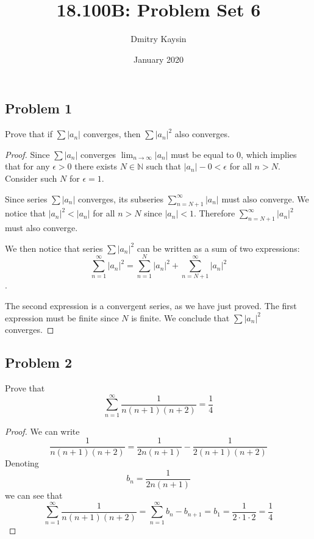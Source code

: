 \documentclass{article}
\title{18.100B: Problem Set 6}
\author{Dmitry Kaysin}
\date{January 2020}
\newcommand{\N}{\mathbb{N}}
\theoremstyle{remark}
\begin{document}
\maketitle 


\subsection*{Problem 1}

\begin{tcolorbox}
Prove that if $\sum |a_n|$ converges, then $\sum |a_n|^2$ also converges.
\end{tcolorbox}

\begin{proof}

Since  $\sum |a_n|$ converges $\lim_{n \to \infty} |a_n|$ must be equal to $0$, which implies that for any $\epsilon>0$ there exists $N \in \N$ such that $|a_n| - 0 < \epsilon$ for all $n > N$.
Consider such $N$ for $\epsilon = 1$.

Since series $\sum |a_n|$ converges, its subseries $\sum_{n=N+1}^{\infty}|a_n|$ must also converge.
We notice that $|a_n|^2 < |a_n|$ for all $n>N$ since $|a_n| < 1$. Therefore $\sum_{n=N+1}^{\infty}|a_n|^2$ must also converge.

We then notice that series $\sum |a_n|^2$ can be written as a sum of two expressions: 
$$ \sum_{n=1}^{\infty} |a_n|^2 = \sum_{n=1}^{N} |a_n|^2 + \sum_{n=N+1}^{\infty} |a_n|^2 $$.

The second expression is a convergent series, as we have just proved. The first expression must be finite since $N$ is finite. We conclude that $\sum |a_n|^2$ converges.

\end{proof}


\subsection*{Problem 2}

\begin{tcolorbox}
Prove that 
$$ \sum_{n=1}^{\infty} \frac{1}{n(n+1)(n+2)} = \frac{1}{4} $$
\end{tcolorbox}

\begin{proof}

We can write 
\[ \frac{1}{n(n+1)(n+2)} = \frac{1}{2n(n+1)}-\frac{1}{2(n+1)(n+2)} \]
Denoting 
\[ b_n = \frac{1}{2n(n+1)} \]
we can see that
\[ \sum_{n=1}^{\infty} \frac{1}{n(n+1)(n+2)} =  \sum_{n=1}^{\infty} b_n - b_{n+1} = b_1 = \frac{1}{2 \cdot 1 \cdot 2} = \frac{1}{4} \]

\end{proof}
\end{document}
